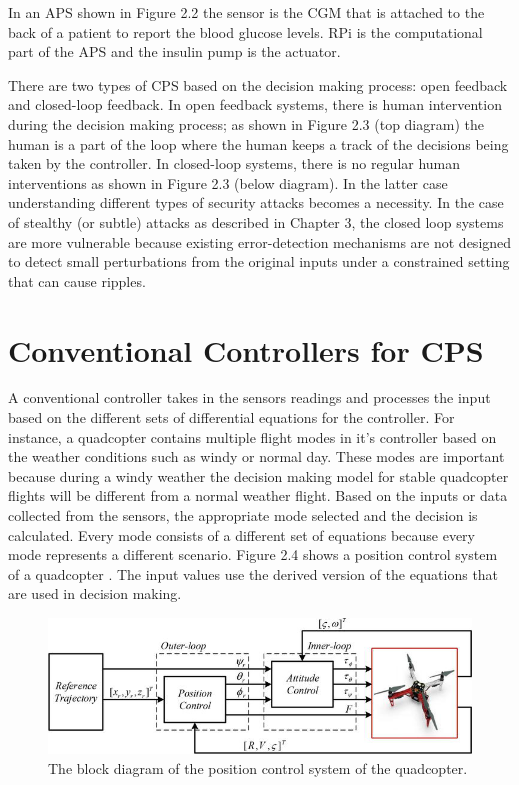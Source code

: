 In an \ac{APS} shown in Figure 2.2 the sensor is the \ac{CGM} that is attached to the back of a patient to report the blood glucose levels.  
\ac{RPi} is the computational part of the \ac{APS} and the insulin pump is the actuator. 

There are two types of CPS based on the decision making process: open feedback and closed-loop feedback.
In open feedback systems, there is human intervention during the decision making process; as shown in Figure 2.3 (top diagram) the human is a part of the loop where the human keeps a track of the decisions being taken by the controller. 
In closed-loop systems, there is no regular human interventions as shown in Figure 2.3 (below diagram). 
 In the latter case understanding different types of security attacks becomes a necessity. 
 In the case of stealthy (or subtle) attacks as described in Chapter 3, the closed loop systems are more vulnerable because existing error-detection mechanisms are not designed to detect small perturbations from the original inputs under a constrained setting that can cause ripples. 

\section{Conventional Controllers for CPS}

A conventional controller takes in the sensors readings and processes the input based on the different sets of differential equations for the controller. 
 For instance, a quadcopter contains multiple flight modes in it's controller based on the weather conditions such as windy or normal day. 
 These modes are important because during a windy weather the decision making model for stable quadcopter flights will be different from a normal weather flight. 
 Based on the inputs or data collected from the sensors, the appropriate  mode selected and the decision is calculated. 
 Every mode consists of a different set of equations because every mode represents a different scenario.
  Figure 2.4 shows a position control system of a quadcopter \cite{inbook}. The input values use the derived version of the equations that are used in decision making. 

\begin{figure}
	\centering
	\includegraphics[width=0.7\linewidth]{Images/controltheory}
	\caption{The block diagram of the position control system of the quadcopter.
	}
	\label{fig:controltheory}
\end{figure}


